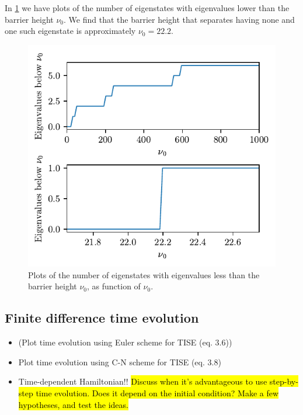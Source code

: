 In \cref{fig:eigenvalues_roots} we have plots of the number of eigenstates with eigenvalues lower than the barrier height $\nu_0$. We find that the barrier height that separates having none and one such eigenstate is approximately $\nu_0 = 22.2$.
\begin{figure}[ht!]%
\centering%
\includegraphics{figs/number_of_roots.pdf}%
\caption{Plots of the number of eigenstates with eigenvalues less than the barrier height $\nu_0$, as function of $\nu_0$. \label{fig:eigenvalues_roots}}%
\end{figure}

\subsection*{Finite difference time evolution}
\begin{itemize}
    \item (Plot time evolution using Euler scheme for TISE (eq. 3.6))
    \item Plot time evolution using C-N scheme for TISE (eq. 3.8)
    \item Time-dependent Hamiltonian!! \hl{Discuss when it's advantageous to use step-by-step time evolution. Does it depend on the initial condition? Make a few hypotheses, and test the ideas.}
\end{itemize}

